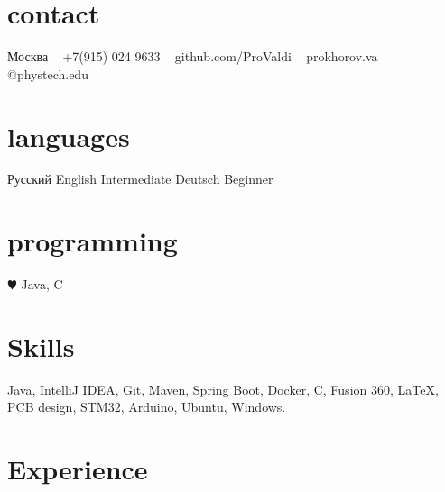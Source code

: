 \documentclass[]{cv-style}          %
\begin{document}
\lastupdated


\begin{aside}
%
\section{contact}
Москва
~
+7(915) 024 9633
~
github.com/ProValdi
~
prokhorov.va
@phystech.edu
%
\section{languages}
Русский
English Intermediate
Deutsch Beginner
%
\section{programming}
{\color{red} $\varheartsuit$} Java,
C
%
\end{aside}


\section{Skills}
  \vspace{-0.4cm}
Java, IntelliJ IDEA, Git, Maven, Spring Boot, Docker, C, Fusion 360, \LaTeX{}, PCB design, STM32, Arduino, Ubuntu, Windows.


\section{Experience}
\end{document}
